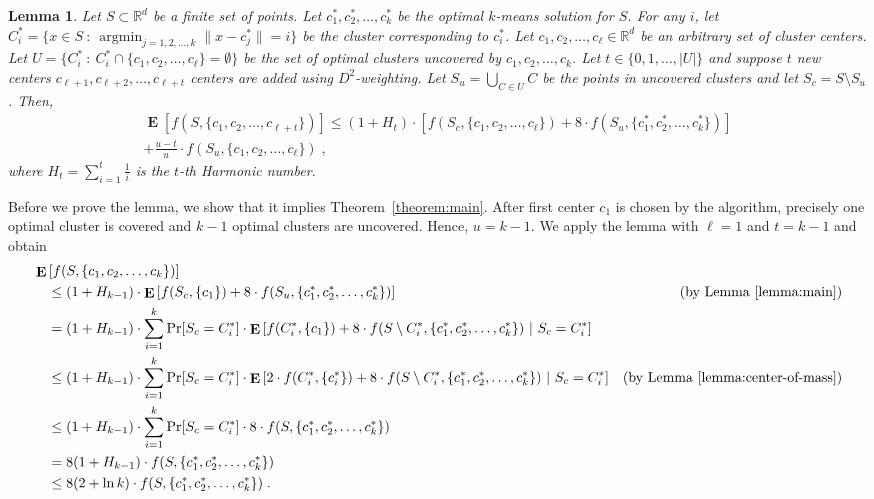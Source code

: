 \documentclass[9pt]{article}
\newtheorem{lemma}{Lemma}
\newcommand{\R}{\mathbb{R}}
\newcommand{\norm}[1]{\|{#1}\|}
\DeclareMathOperator*{\argmin}{argmin}
\DeclareMathOperator*{\Exp}{\mathbf{E}}
\begin{document}
\begin{lemma}
\label{lemma:main}
Let $S \subset \R^d$ be a finite set of points. Let $c^*_1, c^*_2, \dots, c^*_k$
be the optimal $k$-means solution for $S$. For any $i$, let $C^*_i = \{ x \in S ~:~
\argmin_{j=1,2,\dots,k} \norm{x - c_j^*} = i\}$ be the cluster corresponding to
$c^*_i$. Let $c_1, c_2, \dots, c_\ell \in \R^d$ be an arbitrary set of cluster
centers. Let $U = \{ C_i^* ~:~ C_i^* \cap \{c_1, c_2, \dots, c_\ell\} =
\emptyset \}$ be the set of optimal clusters uncovered by $c_1, c_2, \dots, c_k$.
Let $t \in \{0, 1, \dots, |U|\}$ and suppose $t$ new centers $c_{\ell+1},
c_{\ell+2}, \dots, c_{\ell+t}$ centers are added using $D^2$-weighting. Let $S_u =
\bigcup_{C \in U} C$ be the points in uncovered clusters and let $S_c = S
\setminus S_u$. Then,
\begin{multline}
\label{equation:main-lemma}
\Exp \left[ f(S, \{c_1, c_2, \dots, c_{\ell+t}\}) \right]
\le (1 + H_t) \cdot \left[f(S_c, \{c_1, c_2, \dots, c_\ell\}) + 8 \cdot f(S_u, \{c^*_1, c^*_2, \dots, c^*_k\}) \right] \\
 + \frac{u-t}{u} \cdot f(S_u, \{c_1, c_2, \dots, c_\ell\} ) \; ,
\end{multline}
where $H_t = \sum_{i=1}^t \frac{1}{i}$ is the $t$-th Harmonic number.
\end{lemma}

Before we prove the lemma, we show that it implies Theorem~\ref{theorem:main}.
After first center $c_1$ is chosen by the algorithm, precisely one optimal cluster
is covered and $k-1$ optimal clusters are uncovered. Hence, $u=k-1$.
We apply the lemma with $\ell=1$ and $t=k-1$ and obtain
\begin{align*}
& \Exp \left[ f(S, \{c_1, c_2, \dots, c_k\}) \right] \\
& \quad \le (1 + H_{k-1}) \cdot \Exp\left[f(S_c, \{c_1\}) + 8 \cdot f(S_u, \{c^*_1, c^*_2, \dots, c^*_k\}) \right] & \text{(by Lemma~\ref{lemma:main})} \\
& \quad = (1 + H_{k-1}) \cdot \sum_{i=1}^k \Pr[S_c = C^*_i] \cdot \Exp\left[f(C^*_i, \{c_1\}) + 8 \cdot f(S \setminus C^*_i, \{c^*_1, c^*_2, \dots, c^*_k\}) ~\middle|~ S_c = C^*_i \right] \\
& \quad \le (1 + H_{k-1}) \cdot \sum_{i=1}^k \Pr[S_c = C^*_i] \cdot \Exp\left[2 \cdot f(C^*_i, \{c^*_i\}) + 8 \cdot f(S \setminus C^*_i, \{c^*_1, c^*_2, \dots, c^*_k\}) ~\middle|~ S_c = C^*_i \right] & \text{(by Lemma~\ref{lemma:center-of-mass})}  \\
& \quad \le (1 + H_{k-1}) \cdot \sum_{i=1}^k \Pr[S_c = C^*_i] \cdot 8 \cdot f(S, \{c^*_1, c^*_2, \dots, c^*_k\}) \\
& \quad = 8 (1 + H_{k-1}) \cdot f(S, \{c^*_1, c^*_2, \dots, c^*_k\}) \\
& \quad \le 8 (2 + \ln k) \cdot f(S, \{c^*_1, c^*_2, \dots, c^*_k\}) \; .
\end{align*}
\end{document}
